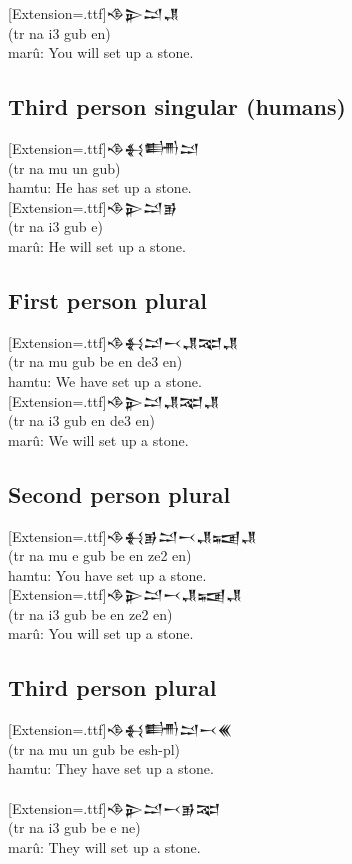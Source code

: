 \documentclass[a4paper,12pt]{book}
\newcommand{\fsm}{\Large\setmainfont{Akkadian}[Extension=.ttf]}
\begin{document}
\noindent
{\fsm 𒈾𒉌𒁺𒂗}\\
(tr na i3 gub en)\\
marû: You will set up a stone.

\newpage
\subsection*{Third person singular (humans)}
{\fsm 𒈾𒈬𒌦𒁺}\\
(tr na mu un gub)\\
hamtu: He has set up a stone.\\

\noindent
{\fsm 𒈾𒉌𒁺𒂊}\\
(tr na i3 gub e)\\
marû: He will set up a stone.

\subsection*{First person plural}
{\fsm 𒈾𒈬𒁺𒁁𒂗𒉈𒂗}\\
(tr na mu gub be en de3 en)\\
hamtu: We have set up a stone.\\

\noindent
{\fsm 𒈾𒉌𒁺𒂗𒉈𒂗}\\
(tr na i3 gub en de3 en)\\
marû: We will set up a stone.

\subsection*{Second person plural}
{\fsm 𒈾𒈬𒂊𒁺𒁁𒂗𒍢𒂗}\\
(tr na mu e gub be en ze2 en)\\
hamtu: You have set up a stone.\\

\noindent
{\fsm 𒈾𒉌𒁺𒁁𒂗𒍢𒂗}\\
(tr na i3 gub be en ze2 en)\\
marû: You will set up a stone.

\newpage
\subsection*{Third person plural}
{\fsm 𒈾𒈬𒌦𒁺𒁁𒌍}\\
(tr na mu un gub be esh-pl)\\
hamtu: They have set up a stone.\\

\verb||\\
{\fsm 𒈾𒉌𒁺𒁁𒂊𒉈}\\
(tr na i3 gub be e ne)\\
marû: They will set up a stone.\\
\end{document}

